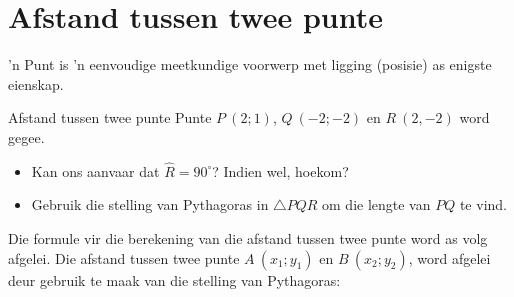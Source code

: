 \section{Afstand tussen twee punte}
'n Punt is 'n eenvoudige meetkundige voorwerp met ligging (posisie) as enigste eienskap. 


\begin{Investigation}{Afstand tussen twee punte}
Punte $P~(2;1)$, $Q~(-2;-2)$ en $R~(2,-2)$ word gegee. 
\begin{itemize}
 \item Kan ons aanvaar dat $\hat{R}=90^{\circ}$? Indien wel, hoekom?
\item Gebruik die stelling van Pythagoras in $\triangle PQR$ om die lengte van $PQ$ te vind.
\end{itemize}
\vspace*{-10pt}
\setcounter{subfigure}{0}
\begin{figure}[H] %
\begin{center}
\end{center}
\label{fig:trianglePQR}
\end{figure} 
\end{Investigation}       
%       
Die formule vir die berekening van die afstand tussen twee punte word as volg afgelei. Die afstand tussen twee
punte $A~({x}_{1};{y}_{1})$ en $B~({x}_{2};{y}_{2})$, word afgelei deur gebruik te maak van die stelling van Pythagoras:\par 

